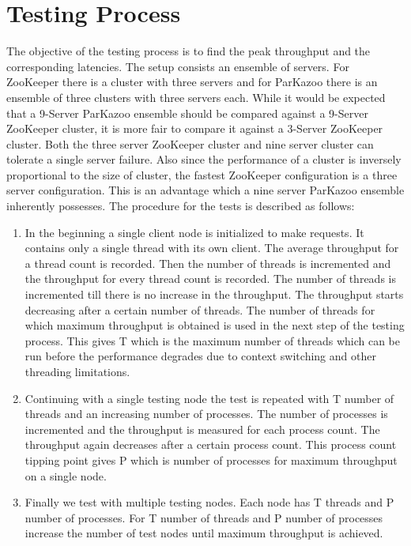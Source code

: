 





\section{Testing Process}
The objective of the testing process is to find the peak throughput and the corresponding latencies. The setup consists an ensemble of servers. For ZooKeeper there is a cluster with three servers and for ParKazoo there is an ensemble of three clusters with three servers each. While it would be expected that a 9-Server ParKazoo ensemble should be compared against a 9-Server ZooKeeper cluster, it is more fair to compare it against a 3-Server ZooKeeper cluster. Both the three server ZooKeeper cluster and nine server cluster can tolerate a single server failure. Also since the performance of a cluster is inversely proportional to the size of cluster, the fastest ZooKeeper configuration is a three server configuration. This is an advantage which a nine server ParKazoo ensemble inherently possesses. The procedure for the tests is described as follows:

\begin{enumerate}
	\item In the beginning a single client node is initialized to make requests. It contains only a single thread with its own client. The average throughput for a thread count is recorded. Then the number of threads is incremented and the throughput for every thread count is recorded. The number of threads is incremented till there is no increase in the throughput. The throughput starts decreasing after a certain number of threads. The number of threads for which maximum throughput is obtained is used in the next step of the testing process. This gives T which is the maximum number of threads which can be run before the performance degrades due to context switching and other threading limitations.
	\item Continuing with a single testing node the test is repeated with T number of threads and an increasing number of processes. The number of processes is incremented and the throughput is measured for each process count. The throughput again decreases after a certain process count. This process count tipping point gives P which is number of processes for maximum throughput on a single node.
	\item Finally we test with multiple testing nodes. Each node has T threads and P number of processes. For T number of threads and P number of processes increase the number of test nodes until maximum throughput is achieved.
\end{enumerate}

